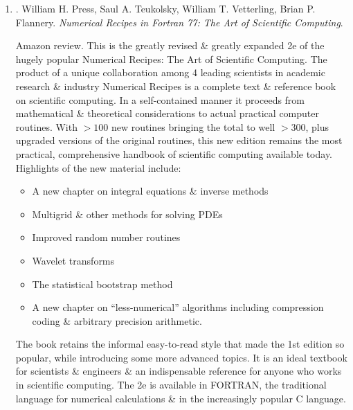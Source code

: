 \documentclass{article}
\begin{document}
\begin{enumerate}
	\item \cite{Press_Teukolsky_Vetterling_Flannery_recipe_Fortran77}. {\sc William H. Press, Saul A. Teukolsky, William T. Vetterling, Brian P. Flannery}. {\it Numerical Recipes in Fortran 77: The Art of Scientific Computing}. {}

	{\sf Amazon review.} This is the greatly revised \& greatly expanded 2e of the hugely popular Numerical Recipes: The Art of Scientific Computing. The product of a unique collaboration among 4 leading scientists in academic research \& industry Numerical Recipes is a complete text \& reference book on scientific computing. In a self-contained manner it proceeds from mathematical \& theoretical considerations to actual practical computer routines. With $> 100$ new routines bringing the total to well $> 300$, plus upgraded versions of the original routines, this new edition remains the most practical, comprehensive handbook of scientific computing available today. Highlights of the new material include:
	\begin{itemize}
		\item A new chapter on integral equations \& inverse methods
		\item Multigrid \& other methods for solving PDEs
		\item Improved random number routines
		\item Wavelet transforms
		\item The statistical bootstrap method
		\item A new chapter on ``less-numerical'' algorithms including compression coding \& arbitrary precision arithmetic.
	\end{itemize}
	The book retains the informal easy-to-read style that made the 1st edition so popular, while introducing some more advanced topics. It is an ideal textbook for scientists \& engineers \& an indispensable reference for anyone who works in scientific computing. The 2e is available in FORTRAN, the traditional language for numerical calculations \& in the increasingly popular C language.


\end{enumerate}
\end{document}
